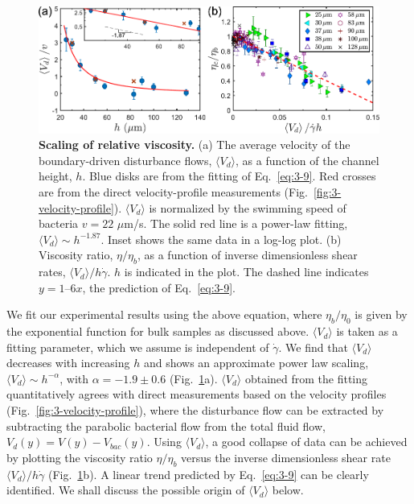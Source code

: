 \begin{figure}[!ht]
	\begin{center}
	\includegraphics[width=5.5 in]{Figs/3-Rheo/6.pdf}
	\end{center}
	\caption[Scaling of Relative Viscosity of Bacterial Suspensions]
	{
	\textbf{Scaling of relative viscosity.}
   (a) The average velocity of the boundary-driven disturbance flows, $\langle V_d \rangle$, as a function of the channel height, $h$. Blue disks are from the fitting of Eq.~\ref{eq:3-9}. Red crosses are from the direct velocity-profile measurements (Fig.~\ref{fig:3-velocity-profile}). $\langle V_d \rangle$ is normalized by the swimming speed of bacteria $v = 22$ $\mu$m/s. The solid red line is a power-law fitting, $\langle V_d \rangle \sim h^{-1.87}$. Inset shows the same data in a log-log plot.
   (b) Viscosity ratio, $\eta/\eta_b$, as a function of inverse dimensionless shear rates, $\langle V_d \rangle / h\dot\gamma$. $h$ is indicated in the plot. The dashed line indicates $y = 1 – 6x$, the prediction of Eq.~\ref{eq:3-9}.
  }
	\label{fig:3-scaling}
\end{figure}


We fit our experimental results using the above equation, where $\eta_b/\eta_0$ is given by the exponential function for bulk samples as discussed above. $\langle V_d \rangle$ is taken as a fitting parameter, which we assume is independent of $\dot\gamma$. We find that $\langle V_d \rangle$ decreases with increasing $h$ and shows an approximate power law scaling, $\langle V_d \rangle \sim h^{-\alpha}$, with $\alpha = - 1.9 \pm 0.6$ (Fig.~\ref{fig:3-scaling}a).
$\langle V_d \rangle$ obtained from the fitting quantitatively agrees with direct measurements based on the velocity profiles (Fig.~\ref{fig:3-velocity-profile}), where the disturbance flow can be extracted by subtracting the parabolic bacterial flow from the total fluid flow, $V_d(y) = V(y) - V_{bac}(y)$. Using $\langle V_d \rangle$, a good collapse of data can be achieved by plotting the viscosity ratio $\eta/\eta_b$ versus the inverse dimensionless shear rate $\langle V_d \rangle / h\dot\gamma$ (Fig.~\ref{fig:3-scaling}b).
A linear trend predicted by Eq.~\ref{eq:3-9} can be clearly identified. We shall discuss the possible origin of $\langle V_d \rangle$ below.

